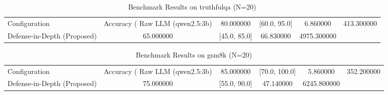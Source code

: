 \begin{table}
\caption{Benchmark Results on truthfulqa (N=20)}
\label{tab:truthfulqa_benchmark}
\begin{tabular}{lcccc}
\toprule
Configuration & Accuracy (%
\midrule
Raw LLM (qwen2.5:3b) & 80.000000 & [60.0, 95.0] & 6.860000 & 413.300000 \\
Defense-in-Depth (Proposed) & 65.000000 & [45.0, 85.0] & 66.830000 & 4975.300000 \\
\bottomrule
\end{tabular}
\end{table}

\begin{table}
\caption{Benchmark Results on gsm8k (N=20)}
\label{tab:gsm8k_benchmark}
\begin{tabular}{lcccc}
\toprule
Configuration & Accuracy (%
\midrule
Raw LLM (qwen2.5:3b) & 85.000000 & [70.0, 100.0] & 5.860000 & 352.200000 \\
Defense-in-Depth (Proposed) & 75.000000 & [55.0, 90.0] & 47.140000 & 6245.800000 \\
\bottomrule
\end{tabular}
\end{table}
